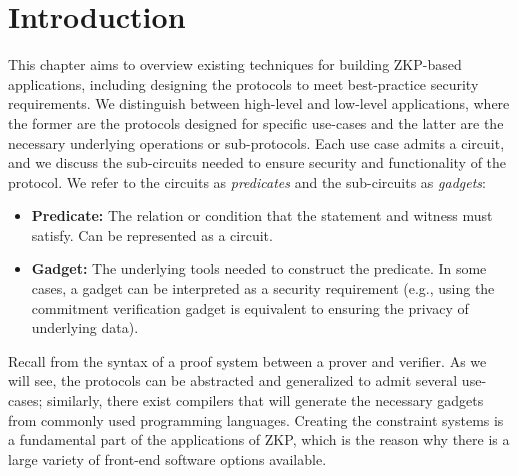 \section{Introduction}  %
\label{apps:intro}
 
This chapter aims to overview existing techniques for building ZKP-based applications, including designing the protocols to meet best-practice security requirements.
We distinguish between high-level and low-level applications, where the former are the protocols designed for specific use-cases and the latter are the necessary underlying operations or sub-protocols.
Each use case admits a circuit, and we discuss the sub-circuits needed to ensure security and functionality of the protocol.
We refer to the circuits as \emph{predicates} and the sub-circuits as \emph{gadgets}:
\begin{itemize}

\item {\bfseries \hypertarget{def:predicate}{Predicate}:} 
The relation or condition that the statement and witness must satisfy.
Can be represented as a circuit.

\item {}
\textbf{\hypertarget{def:gadget}{Gadget}:} The underlying tools needed to construct the predicate.  
In some cases, a gadget can be interpreted as a security requirement 
(e.g., using the commitment verification gadget is equivalent to ensuring the privacy of underlying data).
\loosen

\end{itemize}


	Recall from 
the syntax of a proof system between a prover and verifier.
	As we will see, the protocols can be abstracted and generalized to admit several use-cases; 
similarly, there exist compilers that will generate the necessary gadgets from commonly used programming languages. 
	Creating the constraint systems is a fundamental part of the applications of ZKP, which is the reason why there is a large variety of front-end software options available.






